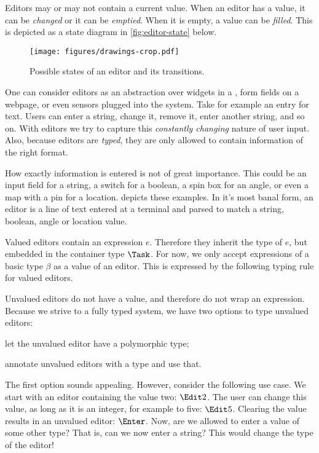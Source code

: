 Editors may or may not contain a current value.
When an editor has a value, it can be \emph{changed} or it can be \emph{emptied}.
When it is empty, a value can be \emph{filled}.
This is depicted as a state diagram in \autoref{fig:editor-state} below.

\begin{figure}
  \centering
  \texttt{[image: figures/drawings-crop.pdf]}
  \caption{Possible states of an editor and its transitions.}
  \label{fig:editor-state}
\end{figure}

One can consider editors as an abstraction over widgets in a \GUI,
form fields on a webpage,
or even sensors plugged into the system.
Take for example an entry for text.
Users can enter a string, change it, remove it, enter another string, and so on.
With editors we try to capture this \emph{constantly changing} nature of user input.
Also, because editors are \emph{typed},
they are only allowed to contain information of the right format.

How exactly information is entered is not of great importance.
This could be an input field for a string,
a switch for a boolean,
a spin box for an angle,
or even a map with a pin for a location.
 depicts these examples.
In it's most banal form,
an editor is a line of text entered at a terminal and parsed to match a string, boolean, angle or location value.

Valued editors contain an expression $e$.
Therefore they inherit the type of $e$,
but embedded in the container type $\Task$.
For now, we only accept expressions of a basic type $\beta$ as a value of an editor.
This is expressed by the following typing rule for valued editors.

Unvalued editors do not have a value,
and therefore do not wrap an expression.
Because we strive to a fully typed system,
we have two options to type unvalued editors:
\begin{enumerate*}
  \item let the unvalued editor have a polymorphic type;
  \item annotate unvalued editors with a type and use that. \label{itm:annotate}
\end{enumerate*}

The first option sounds appealing.
However, consider the following use case.
We start with an editor containing the value two: $\Edit 2$.
The user can change this value, as long as it is an integer,
for example to five: $\Edit 5$.
Clearing the value results in an unvalued editor: $\Enter$.
Now, are we allowed to enter a value of some other type?
That is, can we now enter a string?
This would change the type of the editor!

